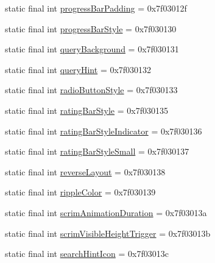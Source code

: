 \begin{DoxyCompactItemize}
static final int \mbox{\hyperlink{classandroid_1_1support_1_1design_1_1_r_1_1attr_afa9abb508c16f8f259a7a135620799c3}{progress\+Bar\+Padding}} = 0x7f03012f
\item 
static final int \mbox{\hyperlink{classandroid_1_1support_1_1design_1_1_r_1_1attr_ac2e0d8d03a6e205fa686581d6af25372}{progress\+Bar\+Style}} = 0x7f030130
\item 
static final int \mbox{\hyperlink{classandroid_1_1support_1_1design_1_1_r_1_1attr_a2403d7a3c33cba76857ac5c2d3a0a655}{query\+Background}} = 0x7f030131
\item 
static final int \mbox{\hyperlink{classandroid_1_1support_1_1design_1_1_r_1_1attr_aaf177eb8b4898900e454469e4c906a16}{query\+Hint}} = 0x7f030132
\item 
static final int \mbox{\hyperlink{classandroid_1_1support_1_1design_1_1_r_1_1attr_af48a1a4964a53fc579b8146882a10944}{radio\+Button\+Style}} = 0x7f030133
\item 
static final int \mbox{\hyperlink{classandroid_1_1support_1_1design_1_1_r_1_1attr_a21a3bd3b5ca0c7dc36f25acf117b4b39}{rating\+Bar\+Style}} = 0x7f030135
\item 
static final int \mbox{\hyperlink{classandroid_1_1support_1_1design_1_1_r_1_1attr_ab9c3e7b470468960aae515a685e657f1}{rating\+Bar\+Style\+Indicator}} = 0x7f030136
\item 
static final int \mbox{\hyperlink{classandroid_1_1support_1_1design_1_1_r_1_1attr_ad36f5bb96868457223dce2f469d1bee3}{rating\+Bar\+Style\+Small}} = 0x7f030137
\item 
static final int \mbox{\hyperlink{classandroid_1_1support_1_1design_1_1_r_1_1attr_af9a4560dd35e304aa6dccaf7bfa79ae8}{reverse\+Layout}} = 0x7f030138
\item 
static final int \mbox{\hyperlink{classandroid_1_1support_1_1design_1_1_r_1_1attr_adf83f2141b7f24cc3d0947b974476b23}{ripple\+Color}} = 0x7f030139
\item 
static final int \mbox{\hyperlink{classandroid_1_1support_1_1design_1_1_r_1_1attr_ae3b14738867106beebf9f57a82f7d878}{scrim\+Animation\+Duration}} = 0x7f03013a
\item 
static final int \mbox{\hyperlink{classandroid_1_1support_1_1design_1_1_r_1_1attr_a90b72c1ee9aab8f6624040d833dc2afe}{scrim\+Visible\+Height\+Trigger}} = 0x7f03013b
\item 
static final int \mbox{\hyperlink{classandroid_1_1support_1_1design_1_1_r_1_1attr_a35f90fcbb52285c4c53e62b7e2c3c289}{search\+Hint\+Icon}} = 0x7f03013c
\item 

\end{DoxyCompactItemize}
